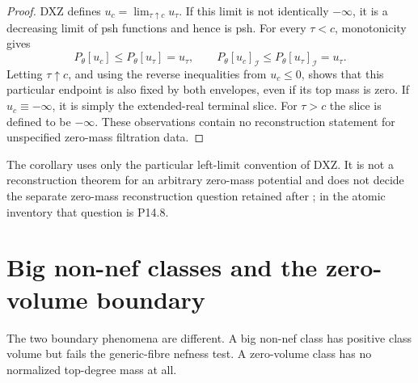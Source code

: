 \begin{proof}
DXZ defines \(u_c=\lim_{\tau\uparrow c}u_\tau\).
If this limit is not identically \(-\infty\), it is a decreasing limit of
psh functions and hence is psh.
For every \(\tau<c\), monotonicity gives
\[
 P_\theta[u_c]\leq P_\theta[u_\tau]=u_\tau,\qquad
 P_\theta[u_c]_{\mathcal I}\leq
                          P_\theta[u_\tau]_{\mathcal I}=u_\tau.
\]
Letting \(\tau\uparrow c\), and using the reverse inequalities from
\(u_c\leq0\), shows that this particular endpoint is also fixed by both
envelopes, even if its top mass is zero.
If \(u_c\equiv-\infty\), it is simply the extended-real terminal slice.
For \(\tau>c\) the slice is defined to be \(-\infty\).
These observations contain no reconstruction statement for unspecified
zero-mass filtration data.
\end{proof}

The corollary uses only the particular left-limit convention of DXZ.  It is
not a reconstruction theorem for an arbitrary zero-mass potential and does
not decide the separate zero-mass reconstruction question retained after
; in the atomic inventory that question is
P14.8.

\section{Big non-nef classes and the zero-volume boundary}
\label{sec:pseff-boundary}

The two boundary phenomena are different.  A big non-nef class has
positive class volume but fails the generic-fibre nefness test.  A
zero-volume class has no normalized top-degree mass at all.

